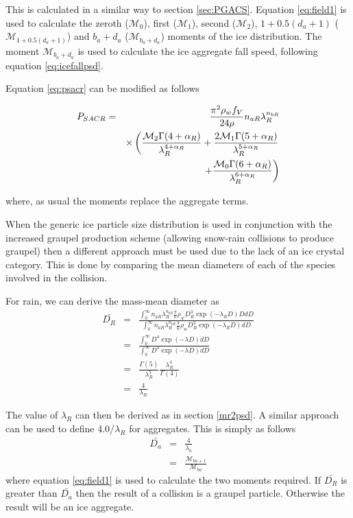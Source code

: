 \documentclass{UMDP_article}
\begin{document}
This is calculated in a similar way to section \ref{sec:PGACS}. 
Equation \ref{eq:field1} is used to calculate the zeroth ($\mathcal{M}_0$), 
first ($\mathcal{M}_1$), second ($\mathcal{M}_2$), $1+0.5(d_a+1)$ 
($\mathcal{M}_{1+0.5(d_a+1)}$) and $b_a+d_a$ 
($\mathcal{M}_{b_a+d_a}$) moments of the ice distribution. The moment 
$\mathcal{M}_{b_a+d_a}$ is used to calculate the ice aggregate fall speed, 
following equation \ref{eq:icefallpsd}. 

Equation \ref{eq:psacr} can be modified as follows

\begin{eqnarray}
P_{SACR}& =& \frac { \pi^{2} \rho_w f_V } {24 \rho }  n_{aR} \lambda_R^{n_{bR}} 
\nonumber \\
& & \times
\left(\frac{\mathcal{M}_2 \Gamma(4+\alpha_R)} {\lambda_R^{4+\alpha_R}}
+ \frac{ 2 \mathcal{M}_1 \Gamma(5+\alpha_R) } {\lambda_R^{5+\alpha_R}} \right. 
\nonumber \\
& & \left. \hspace{1.5cm}+ \frac{\mathcal{M}_0 \Gamma(6+\alpha_R)}
{\lambda_R^{6+\alpha_R} } \right)
\label{eq:psacr_psd}
\end{eqnarray}

where, as usual the moments replace the aggregate terms.

When the generic ice particle size distribution is used in conjunction 
with the increased graupel production scheme (allowing snow-rain collisions to produce 
graupel) then a different approach must be used due to the lack of an ice
crystal category. This is done by comparing the mean diameters of each of 
the species involved in the collision.

For rain, we can derive the mass-mean diameter as
\begin{eqnarray}
\label{rain:mmd}
\bar{D_R}& = & \frac{\int_0^{\infty} n_{aR} \lambda_R^{n_{bR}} \frac{\pi}{6} \rho_w D_R^3 
\exp(-\lambda_R D) D dD }
{\int_0^{\infty} n_{aR} \lambda_R^{n_{bR}} \frac{\pi}{6} \rho_w D_R^3 
\exp(-\lambda_R D) dD } \nonumber \\
         & = & \frac{\int_0^{\infty} D^4 \exp(-\lambda D) dD }
                    {\int_0^{\infty} D^3 \exp(-\lambda D) dD } \nonumber \\
         & = & \frac{\Gamma(5)}{\lambda_R^5} \frac{\lambda_R^4}{\Gamma(4)} \nonumber \\
         & = & \frac{4}{\lambda_R} 
\end{eqnarray}

The value of $\lambda_R$ can then be derived as in section \ref{mr2psd}. A similar
approach can be used to define 4.0/$\lambda_R$ for aggregates. This is simply 
as follows
\begin{eqnarray}
\label{ice:mmd}
\bar{D_a}& = & \frac{4}{\lambda_a}\nonumber \\
         & = & \frac{\mathcal{M}_{ba + 1}}{\mathcal{M}_{ba}}
\end{eqnarray}
where equation \ref{eq:field1} is used to calculate the two moments required.
If $\bar{D_R}$ is greater than $\bar{D_a}$ then the result of a collision is
a graupel particle. Otherwise the result will be an ice aggregate.
\end{document}
